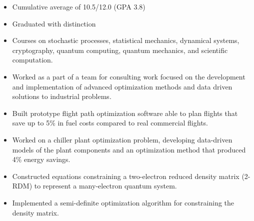 \documentclass[10pt,a4paper,ragged2e]{altacv}
\begin{document}
\divider

\begin{itemize}
\item Cumulative average of 10.5/12.0 (GPA 3.8)
\item Graduated with distinction
\item Courses on stochastic processes, statistical mechanics, dynamical systems, cryptography, quantum computing, quantum mechanics, and scientific computation.
\end{itemize}

{}
\smallskip
{}
\begin{itemize}
\item Worked as a part of a team for consulting work focused on the development and implementation of advanced optimization methods and data driven solutions to industrial problems. 
\item Built prototype flight path optimization software able to plan flights that save up to 5\% in fuel costs compared to real commercial flights. 
\item Worked on a chiller plant optimization problem, developing data-driven models of the plant components and an optimization method that produced 4\% energy savings.
\end{itemize}

\divider

\begin{itemize}
\item Constructed equations constraining a two-electron reduced density matrix (2-RDM) to represent a many-electron quantum system.
\item Implemented a semi-definite optimization algorithm for constraining the density matrix.
\end{itemize}





\end{document}
